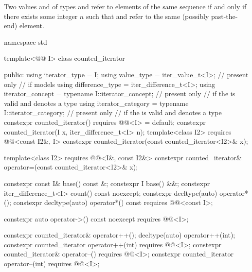\pnum
Two values  and  of types
and
refer to elements of the same sequence if and only if
there exists some integer $n$ such that
and
refer to the same (possibly past-the-end) element.

%
\begin{codeblock}
namespace std {
  template<@@ I>
  class counted_iterator {
  public:
    using iterator_type = I;
    using value_type = iter_value_t<I>;                         // present only
                        // if  models 
    using difference_type = iter_difference_t<I>;
    using iterator_concept = typename I::iterator_concept;      // present only
                        // if the   is valid and denotes a type
    using iterator_category = typename I::iterator_category;    // present only
                        // if the   is valid and denotes a type
    constexpr counted_iterator() requires @@<I> = default;
    constexpr counted_iterator(I x, iter_difference_t<I> n);
    template<class I2>
      requires @@<const I2&, I>
        constexpr counted_iterator(const counted_iterator<I2>& x);

    template<class I2>
      requires @@<I&, const I2&>
        constexpr counted_iterator& operator=(const counted_iterator<I2>& x);

    constexpr const I& base() const &;
    constexpr I base() &&;
    constexpr iter_difference_t<I> count() const noexcept;
    constexpr decltype(auto) operator*();
    constexpr decltype(auto) operator*() const
      requires @@<const I>;

    constexpr auto operator->() const noexcept
      requires @@<I>;

    constexpr counted_iterator& operator++();
    decltype(auto) operator++(int);
    constexpr counted_iterator operator++(int)
      requires @@<I>;
    constexpr counted_iterator& operator--()
      requires @@<I>;
    constexpr counted_iterator operator--(int)
      requires @@<I>;

}}
\end{codeblock}
